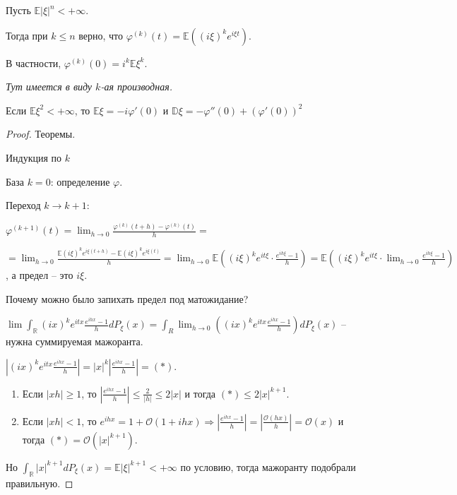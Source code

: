 \begin{theorem}
    Пусть $\mathbb{E} |\xi|^n < +\infty$.
    
    Тогда при $k \leqslant n$ верно, что $\varphi^{(k)} (t) = \mathbb{E} ((i\xi)^k e^{i\xi t}) $.
    
    В частности, $\varphi^{(k)} (0) = i^k \mathbb{E} \xi^k$.

    \textit{Тут имеется в виду $k$-ая производная.}
\end{theorem}

\begin{consequence}
    Если $\mathbb{E} \xi^2 < + \infty$, то $\mathbb{E} \xi = -i \varphi'(0)$ и $\mathbb{D} \xi = -\varphi''(0) + (\varphi'(0))^2$
\end{consequence}

\begin{proof}
    Теоремы.

    Индукция по $k$

    База $k = 0$: определение $\varphi$.

    Переход $k \to k + 1$:
    
    $\varphi^{(k + 1)}(t) = \lim_{h \to 0} \frac{\varphi^{(k)}(t + h) - \varphi^{(k)}(t)}{h} = $

    $= \lim_{h \to 0} \frac{\mathbb{E} (i \xi)^k e^{i\xi(t + h)} - \mathbb{E} (i \xi)^k e^{i\xi(t)}}{h} = 
    \lim_{h \to 0} \mathbb{E} ((i \xi)^k e^{i t \xi} \cdot \frac{e^{ih\xi} - 1}{h}) = \mathbb{E} ((i\xi)^k e^{i t \xi} \cdot \lim_{h \to 0} \frac{e^{i h \xi} - 1}{h})$, а предел -- это $i \xi$.

    Почему можно было запихать предел под матожидание?

    $\lim \int_{\mathbb{R}} (ix)^k e^{itx} \frac{e^{ihx} - 1}{h} d P_{\xi}(x) = \int_{R} \lim_{h \to 0} ((ix)^k e^{itx} \frac{e^{ihx} - 1}{h}) d P_{\xi}(x)$ -- нужна суммируемая мажоранта.

    $\left | (ix)^k e^{itx} \frac{e^{ihx} - 1}{h}  \right | = |x|^k \left | \frac{e^{ihx} - 1}{h} \right | = (*)$.

    \begin{enumerate}
        \item {
            Если $|xh| \geqslant 1$, то $\left | \frac{e^{ihx} - 1}{h} \right | \leqslant \frac{2}{|h|} \leqslant 2|x| $ и тогда $(*) \leq 2|x|^{k + 1}$.
        }
        \item {
            Если $|xh| < 1$, то $e^{ihx} = 1 + \mathcal{O}(1 + ihx) \Rightarrow \left | \frac{e^{ihx} - 1}{h}  \right | = \left | \frac{\mathcal{O}(hx)}{h}  \right | = \mathcal{O}(x)$ и тогда $(*) = \mathcal{O}(|x|^{k + 1})$.
        }
    \end{enumerate}

    Но $\int_{\mathbb{R}} |x|^{k + 1} d P_{\xi} (x) = \mathbb{E} |\xi|^{k + 1} < +\infty$ по условию, тогда мажоранту подобрали правильную.
\end{proof}

